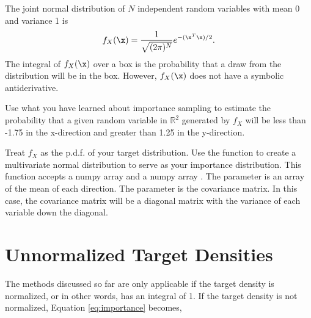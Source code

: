 \begin{problem}
The joint normal distribution of $N$ independent random variables with mean 0 and variance 1 is
\[
f_X(\x) = \frac{1}{\sqrt{(2 \pi)^N}} e^{-(\x^T\x)/2}.
\]
The integral of $f_X(\x)$ over a box is the probability that a draw from the distribution will be in the box.
However, $f_X(\x)$ does not have a symbolic antiderivative.

Use what you have learned about importance sampling to estimate the probability that a given random variable in $\mathbb{R}^2$ generated by $f_X$ will be less than -1.75 in the x-direction and greater than 1.25 in the y-direction.

Treat $f_X$ as the p.d.f. of your target distribution.
Use the function  to create a multivariate normal distribution to serve as your importance distribution. 
This function accepts a numpy array  and a numpy array . 
The parameter  is an array of the mean of each direction. 
The parameter  is the covariance matrix. 
In this case, the covariance matrix will be a diagonal matrix with the variance of each variable down the diagonal. 

\end{problem}

\section*{Unnormalized Target Densities}
The methods discussed so far are only applicable if the target density is normalized, or in other words, has an integral of 1. If the target density is not normalized, Equation \ref{eq:importance} becomes,

